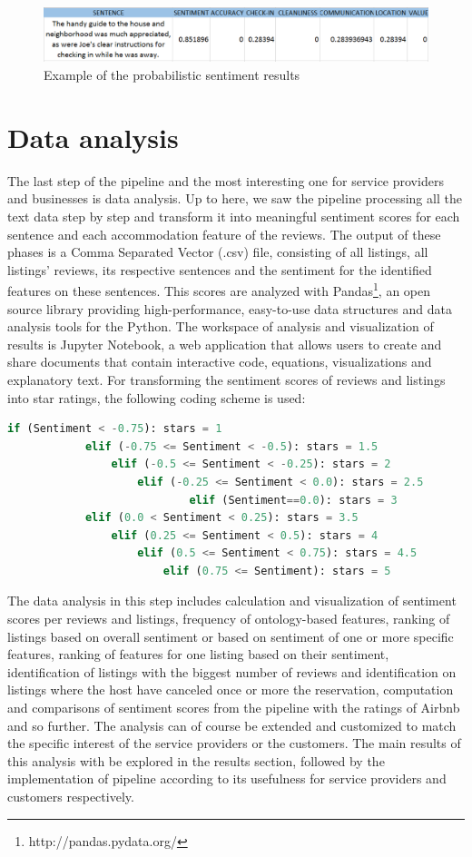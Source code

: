 \begin{figure}[h!]
	\centering
	\includegraphics[height=0.1\textheight]{example_pip}
	\caption{Example of the probabilistic sentiment results}
	\label{fig:sent}
\end{figure}
%
\section{Data analysis}
% 
%
The last step of the pipeline and the most interesting one for service providers and businesses is data analysis. Up to here, we saw the pipeline processing all the text data step by step and transform it into meaningful sentiment scores for each sentence and each accommodation feature of the reviews. The output of these phases is a Comma Separated Vector (.csv) file, consisting of all listings, all listings' reviews, its respective sentences and the sentiment for the identified features on these sentences. This scores are analyzed with Pandas\footnote{http://pandas.pydata.org/}, an open source library providing high-performance, easy-to-use data structures and data analysis tools for the Python. The workspace  of analysis and visualization of results is Jupyter Notebook, a web application that allows users to create and share documents that contain  interactive code, equations, visualizations and explanatory text. For transforming the sentiment scores of reviews and listings into star ratings, the following coding scheme is used:

\tiny
\begin{lstlisting}[language=python]
	if (Sentiment < -0.75):	stars = 1
  			elif (-0.75 <= Sentiment < -0.5): stars = 1.5
    			elif (-0.5 <= Sentiment < -0.25): stars = 2
    				elif (-0.25 <= Sentiment < 0.0): stars = 2.5
            				elif (Sentiment==0.0): stars = 3
    		elif (0.0 < Sentiment < 0.25): stars = 3.5
    			elif (0.25 <= Sentiment < 0.5): stars = 4
    				elif (0.5 <= Sentiment < 0.75): stars = 4.5
    					elif (0.75 <= Sentiment): stars = 5
\end{lstlisting}
\normalsize
The data  analysis in this step includes calculation and visualization of sentiment scores per reviews and listings, frequency of ontology-based features, ranking of listings based on overall sentiment or based on sentiment of one or more specific features, ranking of features for one listing based on their sentiment, identification of listings with the biggest number of reviews and identification on listings where the host have canceled once or more the reservation, computation and comparisons of sentiment scores from the pipeline with the ratings of Airbnb and so further. The analysis can of course be extended and customized to match the specific interest of the service providers or the customers. The main results of this analysis with be explored in the results section, followed by the implementation of pipeline according to its usefulness for service providers and customers respectively. 
